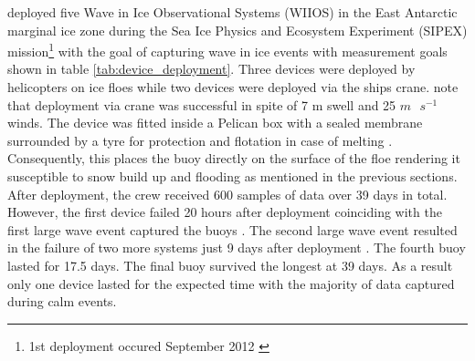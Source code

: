 \textcite{kohout2015device} deployed five Wave in Ice Observational Systems (WIIOS) in the East Antarctic marginal ice zone during the Sea Ice Physics and Ecosystem Experiment (SIPEX) mission\footnote{1st deployment occured September 2012 \cite{kohout2015device}} with the goal of capturing wave in ice events with measurement goals shown in table \ref{tab:device_deployment}. Three devices were deployed by helicopters on ice floes while two devices were deployed via the ships crane. \textcite{kohout2015device}
note that deployment via crane was successful in spite of 7 m swell and 25 $m \text{ }s^{-1}$ winds. The device was fitted inside a Pelican box with a sealed membrane surrounded by a tyre for protection and flotation in case of melting \cite{kohout2015device}. Consequently, this places the buoy directly on the surface of the floe rendering it susceptible to snow build up and flooding as mentioned in the previous sections.  After deployment, the crew received 600 samples of data over 39 days in total. However, the first device failed 20 hours after deployment coinciding with the first large wave event captured the buoys \cite{kohout2015device}. The second large wave event resulted in the failure of two more systems just 9 days after deployment \cite{kohout2015device}. The fourth buoy lasted for 17.5 days. The final buoy survived the longest at 39 days. As a result only one device lasted for the expected time with the majority of data captured during calm events.

